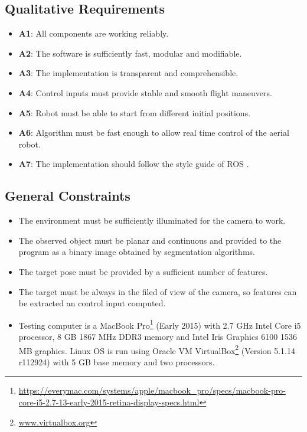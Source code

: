 \subsection{Qualitative Requirements}
\label{sec:other-requirements}

\begin{itemize}
	\item \textbf{A1}: All components are working reliably.
	\item \textbf{A2}: The software is sufficiently fast, modular and modifiable.
	\item \textbf{A3}: The implementation is transparent and comprehensible.
	\item \textbf{A4}: Control inputs must provide stable and smooth flight maneuvers.
	\item \textbf{A5}: Robot must be able to start from different initial positions.
	\item \textbf{A6}: Algorithm must be fast enough to allow real time control of the aerial robot.
	\item \textbf{A7}: The implementation should follow the style guide of ROS \cite{ROS_Style}.
\end{itemize}

\subsection{General Constraints}
\label{sec:general-constraints}

\begin{itemize}
	\item The environment must be sufficiently illuminated for the camera to work.
	\item The observed object must be planar and continuous and provided to the program as a binary image obtained by segmentation algorithms.
	\item The target pose must be provided by a sufficient number of features.
	\item The target must be always in the filed of view of the camera, so features can be extracted an control input computed.
	\item Testing computer is a MacBook Pro\footnote{\url{https://everymac.com/systems/apple/macbook_pro/specs/macbook-pro-core-i5-2.7-13-early-2015-retina-display-specs.html}} (Early 2015) with 2.7 GHz Intel Core i5 processor, 8 GB 1867 MHz DDR3 memory and Intel Iris Graphics 6100 1536 MB graphics. Linux OS is run using Oracle VM VirtualBox\footnote{\url{www.virtualbox.org}} (Version 5.1.14 r112924) with 5 GB base memory and two processors.
\end{itemize}

